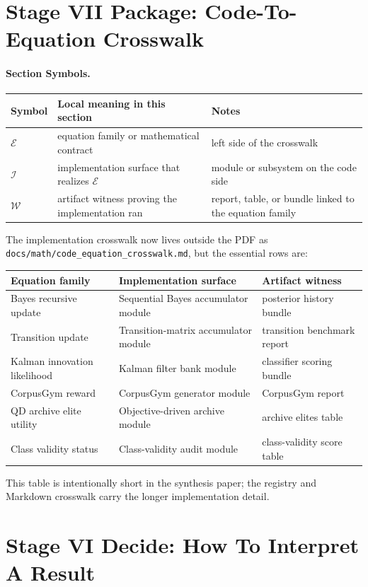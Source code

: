 \documentclass[11pt]{article}
\newcommand{\codepath}[1]{\nolinkurl{#1}}
\newcommand{\sectionsymbol}[3]{#1 & #2 & #3 \\}
\newcommand{\sectionsymbols}[1]{%
\begin{center}
\small
\setlength{\tabcolsep}{4pt}
\begin{tabularx}{0.95\textwidth}{>{\raggedright\arraybackslash}p{0.16\textwidth}X>{\raggedright\arraybackslash}p{0.18\textwidth}}
\toprule
Symbol & Local meaning in this section & Notes \\
\midrule
#1
\bottomrule
\end{tabularx}
\end{center}
}
\begin{document}
\section{Stage VII Package: Code-To-Equation Crosswalk}
\paragraph{Section Symbols.}
\sectionsymbols{
\sectionsymbol{\(\mathcal{E}\)}{equation family or mathematical contract}{left side of the crosswalk}
\sectionsymbol{\(\mathcal{I}\)}{implementation surface that realizes \(\mathcal{E}\)}{module or subsystem on the code side}
\sectionsymbol{\(\mathcal{W}\)}{artifact witness proving the implementation ran}{report, table, or bundle linked to the equation family}
}

\noindent
The implementation crosswalk now lives outside the PDF as
\codepath{docs/math/code_equation_crosswalk.md}, but the essential rows are:
\begin{center}
\small
\setlength{\tabcolsep}{4pt}
\begin{tabularx}{\textwidth}{>{\raggedright\arraybackslash}p{}>{\raggedright\arraybackslash}p{}X}
\toprule
Equation family & Implementation surface & Artifact witness \\
\midrule
Bayes recursive update & Sequential Bayes accumulator module & posterior history bundle \\
Transition update & Transition-matrix accumulator module & transition benchmark report \\
Kalman innovation likelihood & Kalman filter bank module & classifier scoring bundle \\
CorpusGym reward & CorpusGym generator module & CorpusGym report \\
QD archive elite utility & Objective-driven archive module & archive elites table \\
Class validity status & Class-validity audit module & class-validity score table \\
\bottomrule
\end{tabularx}
\end{center}
This table is intentionally short in the synthesis paper; the registry and Markdown crosswalk carry the longer implementation detail.

\section{Stage VI Decide: How To Interpret A Result}
\end{document}
